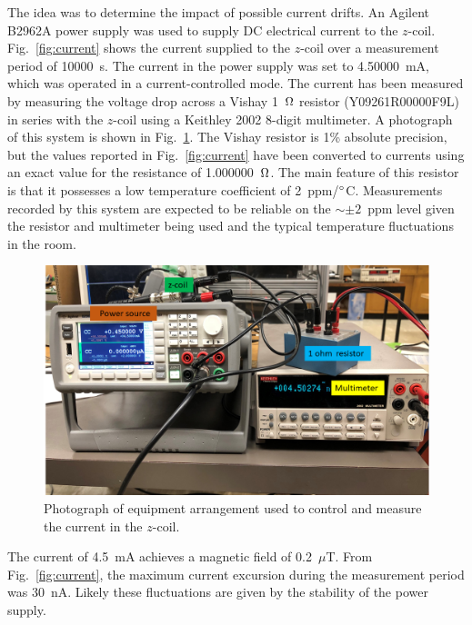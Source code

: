The idea was to determine the impact of possible current drifts.  An
Agilent B2962A power supply was used to supply DC electrical current
to the $z$-coil.  Fig.~\ref{fig:current} shows the current supplied to
the $z$-coil over a measurement period of 10000~s.  The current in the
power supply was set to 4.50000~mA, which was operated in a
current-controlled mode.  The current has been measured by measuring
the voltage drop across a Vishay 1~$\ohm$ resistor (Y09261R00000F9L)
in series with the $z$-coil using a Keithley 2002 8-digit multimeter.
A photograph of this system is shown in
Fig.~\ref{fig:Current_study_setup}.  The Vishay resistor is 1\%
absolute precision, but the values reported in Fig.~\ref{fig:current}
have been converted to currents using an exact value for the
resistance of 1.000000~$\ohm$.  The main feature of this resistor is
that it possesses a low temperature coefficient of 2~ppm/$\degree$C.
Measurements recorded by this system are expected to be reliable on
the $\sim\pm 2$~ppm level given the resistor and multimeter being used
and the typical temperature fluctuations in the room.


\begin{figure}%
\centering
\includegraphics[width=\linewidth]{figures/current_study_setup.png}
\caption{Photograph of equipment arrangement used to control and
  measure the current in the $z$-coil.\label{fig:Current_study_setup}}
\end{figure}

The current of 4.5~mA achieves a magnetic field of 0.2~$\mu$T.  From
Fig.~\ref{fig:current}, the maximum current excursion during the
measurement period was 30~nA.  Likely these fluctuations are given by
the stability of the power supply.

